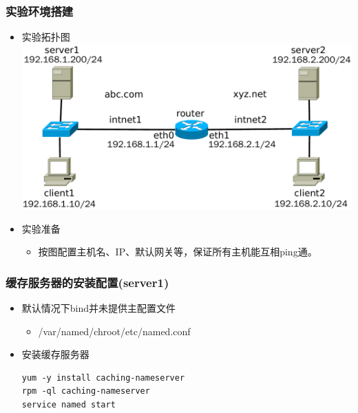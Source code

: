 \documentclass[xcolor=svgnames,presentation]{beamer}
\begin{document}
\begin{frame}
\frametitle{实验环境搭建}
\label{sec-1-2}
\begin{itemize}

\item 实验拓扑图\\
\label{sec-1-2-1}%
\includegraphics[width=.9\linewidth]{img/serverslab.pdf}

\item 实验准备
\label{sec-1-2-2}%
\begin{itemize}

\item 按图配置主机名、IP、默认网关等，保证所有主机能互相ping通。
\label{sec-1-2-2-1}%
\end{itemize} %
\end{itemize} %
\end{frame}
\begin{frame}[fragile]
\frametitle{缓存服务器的安装配置(server1)}
\label{sec-1-3}
\begin{itemize}

\item 默认情况下bind并未提供主配置文件
\label{sec-1-3-1}%
\begin{itemize}

\item /var/named/chroot/etc/named.conf
\label{sec-1-3-1-1}%
\end{itemize} %

\item 安装缓存服务器\\
\label{sec-1-3-2}%
\begin{verbatim}
yum -y install caching-nameserver
rpm -ql caching-nameserver
service named start
\end{verbatim}
\end{itemize} %
\end{frame}
\end{document}
